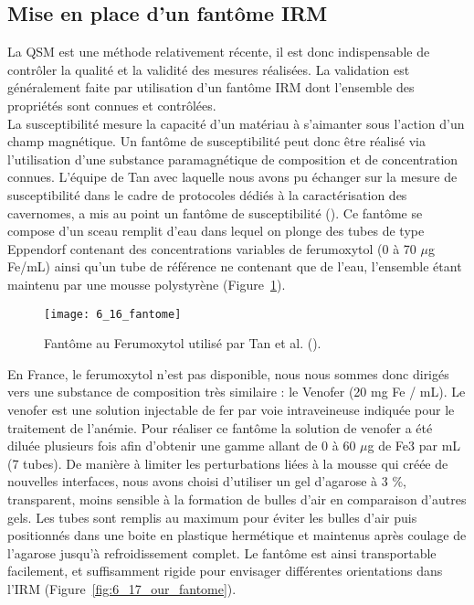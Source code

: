 {\subsection{Mise en place d’un fantôme IRM}
La QSM est une méthode relativement récente, il est donc indispensable de contrôler la qualité
et la validité des mesures réalisées. La validation est généralement faite par utilisation d’un fantôme
IRM dont l’ensemble des propriétés sont connues et contrôlées.\\
La susceptibilité mesure la capacité d’un matériau à s’aimanter sous l’action d’un champ
magnétique. Un fantôme de susceptibilité peut donc être réalisé via l’utilisation d’une substance
paramagnétique de composition et de concentration connues. L’équipe de Tan avec laquelle nous
avons pu échanger sur la mesure de susceptibilité dans le cadre de protocoles dédiés à la
caractérisation des cavernomes, a mis au point un fantôme de susceptibilité (\cite{tan2014}). Ce fantôme se
compose d’un sceau remplit d’eau dans lequel on plonge des tubes de type Eppendorf contenant des
concentrations variables de ferumoxytol (0 à 70 $\mu$g Fe/mL) ainsi qu’un tube de référence ne contenant
que de l’eau, l’ensemble étant maintenu par une mousse polystyrène (Figure~\ref{fig:6_16_fantome}).\\
\begin{figure}[!t]
\centering
\texttt{[image: 6\_16\_fantome]}
\caption{Fantôme au Ferumoxytol utilisé par Tan et al. (\cite{tan2014}).}
\label{fig:6_16_fantome}	
\end{figure}
En France, le ferumoxytol n’est pas disponible, nous nous sommes donc dirigés vers une
substance de composition très similaire : le Venofer (20 mg Fe / mL). Le venofer est une solution
injectable de fer par voie intraveineuse indiquée pour le traitement de l'anémie. Pour réaliser ce
fantôme la solution de venofer a été diluée plusieurs fois afin d’obtenir une gamme allant de 0 à 60 $\mu$g
de Fe3 par mL (7 tubes). De manière à limiter les perturbations liées à la mousse qui créée de nouvelles
interfaces, nous avons choisi d’utiliser un gel d’agarose à 3 \%, transparent, moins sensible à la
formation de bulles d’air en comparaison d’autres gels. Les tubes sont remplis au maximum pour éviter
les bulles d’air puis positionnés dans une boite en plastique hermétique et maintenus après coulage
de l’agarose jusqu’à refroidissement complet. Le fantôme est ainsi transportable facilement, et
suffisamment rigide pour envisager différentes orientations dans l’IRM (Figure~\ref{fig:6_17_our_fantome}).
}

